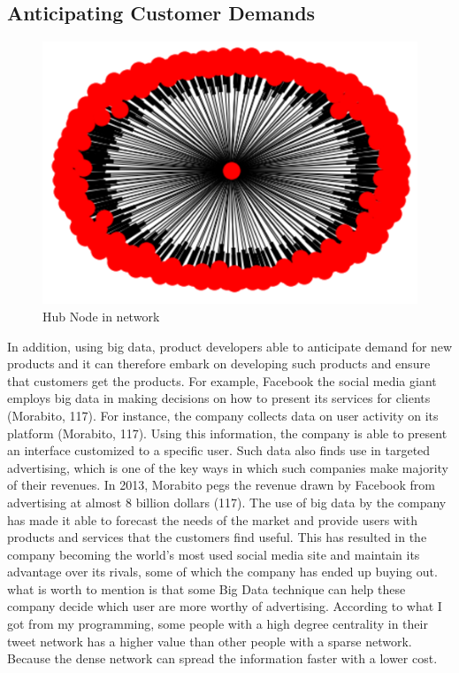 \documentclass[sigconf]{acmart}
\begin{document}
\subsection{Anticipating Customer Demands}
\begin{figure}[!ht]
  \centering\includegraphics[width=\columnwidth]{images/single hub node with high in-degree.png}
  \caption{Hub Node in network }
  \label{Figure 2}
\end{figure}
In addition, using big data, product developers able to anticipate demand for new products and it can therefore embark on developing such products and ensure that customers get the products. For example, Facebook the social media giant employs big data in making decisions on how to present its services for clients (Morabito, 117). For instance, the company collects data on user activity on its platform (Morabito, 117). Using this information, the company is able to present an interface customized to a specific user. Such data also finds use in targeted advertising, which is one of the key ways in which such companies make majority of their revenues. In 2013, Morabito pegs the revenue drawn by Facebook from advertising at almost  8 billion dollars (117). The use of big data by the company has made it able to forecast the needs of the market and provide users with products and services that the customers find useful. This has resulted in the company becoming the world’s most used social media site and maintain its advantage over its rivals, some of which the company has ended up buying out. what is worth to mention is that some Big Data technique can help these company decide which user are more worthy of advertising. According to what I got from my programming, some people with a high degree centrality in their tweet network has a higher value than other people with a sparse network. Because the dense network can spread the information faster with a lower cost.
\end{document}
